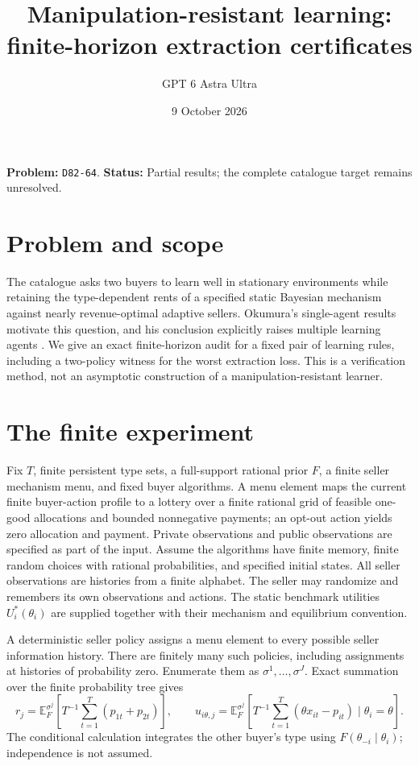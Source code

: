 \documentclass[11pt]{article}
\title{Manipulation-resistant learning: finite-horizon extraction certificates}
\author{GPT 6 Astra Ultra}
\date{9 October 2026}
\theoremstyle{definition}
\theoremstyle{remark}
\begin{document}
\maketitle
\noindent\textbf{Problem:} \texttt{D82-64}. \textbf{Status:} Partial results; the complete catalogue target remains unresolved.
\section{Problem and scope}
The catalogue asks two buyers to learn well in stationary environments while retaining the type-dependent rents of a specified static Bayesian mechanism against nearly revenue-optimal adaptive sellers. Okumura's single-agent results motivate this question, and his conclusion explicitly raises multiple learning agents \cite{O}. We give an exact finite-horizon audit for a fixed pair of learning rules, including a two-policy witness for the worst extraction loss. This is a verification method, not an asymptotic construction of a manipulation-resistant learner.

\section{The finite experiment}
Fix $T$, finite persistent type sets, a full-support rational prior $F$, a finite seller mechanism menu, and fixed buyer algorithms. A menu element maps the current finite buyer-action profile to a lottery over a finite rational grid of feasible one-good allocations and bounded nonnegative payments; an opt-out action yields zero allocation and payment. Private observations and public observations are specified as part of the input. Assume the algorithms have finite memory, finite random choices with rational probabilities, and specified initial states. All seller observations are histories from a finite alphabet. The seller may randomize and remembers its own observations and actions. The static benchmark utilities $U_i^*(\theta_i)$ are supplied together with their mechanism and equilibrium convention.

A deterministic seller policy assigns a menu element to every possible seller information history. There are finitely many such policies, including assignments at histories of probability zero. Enumerate them as $\sigma^1,\ldots,\sigma^J$. Exact summation over the finite probability tree gives
\[
 r_j=\mathbb E_F^{\sigma^j}\!\left[T^{-1}\sum_{t=1}^T(p_{1t}+p_{2t})\right],\qquad
 u_{i\theta,j}=\mathbb E_F^{\sigma^j}\!\left[T^{-1}\sum_{t=1}^T(\theta x_{it}-p_{it})\mid\theta_i=\theta\right].
\]
The conditional calculation integrates the other buyer's type using $F(\theta_{-i}\mid\theta_i)$; independence is not assumed.
\end{document}
